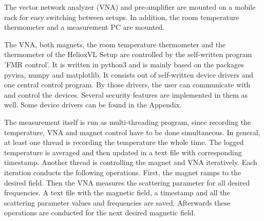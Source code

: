 The vector network analyzer (VNA) and pre-amplifier are mounted on a mobile rack for easy switching between setups. In addition, the room temperature thermometer and a measurement PC are mounted.

The VNA, both magnets, the room temperature thermometer and the thermometer of the HelioxVL Setup are controlled by the self-written program 'FMR control'. It is written in python3 and is mainly based on the packages pyvisa, numpy and matplotlib. It consists out of self-written device drivers and one central control program. By those drivers, the user can communicate with and control the devices. Several security features are implemented in them as well. Some device drivers can be found in the Appendix.

The measurement itself is run as multi-threading program, since recording the temperature, VNA and magnet control have to be done simultaneous. In general, at least one thread is recording the temperature the whole time. The logged temperature is averaged and then updated in a text file with corresponding timestamp. Another thread is controlling the magnet and VNA iteratively. Each iteration conducts the following operations. First, the magnet ramps to the desired field. Then the VNA measures the scattering parameter for all desired frequencies. A text file with the magnetic field, a timestamp and all the scattering parameter values and frequencies are saved. Afterwards these operations are conducted for the next desired magnetic field.